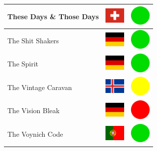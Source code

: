 \documentclass[12pt, a4paper, twoside]{report}
\begin{document}
\begin{center}
\begin{longtable}{|p{5cm}|p{2cm}|p{2cm}|}
 These Days \& Those Days                                   & \includegraphics[width=1cm]{../img/flags/ch} &   \includegraphics[width=1cm]{../likes/y} \\ \hline
 The Shit Shakers                                           & \includegraphics[width=1cm]{../img/flags/de} &   \includegraphics[width=1cm]{../likes/y} \\ \hline
 The Spirit                                                 & \includegraphics[width=1cm]{../img/flags/de} &   \includegraphics[width=1cm]{../likes/y} \\ \hline
 The Vintage Caravan                                        & \includegraphics[width=1cm]{../img/flags/is} &   \includegraphics[width=1cm]{../likes/m} \\ \hline
 The Vision Bleak                                           & \includegraphics[width=1cm]{../img/flags/de} &   \includegraphics[width=1cm]{../likes/n} \\ \hline
 The Voynich Code                                           & \includegraphics[width=1cm]{../img/flags/pt} &   \includegraphics[width=1cm]{../likes/y} \\ \hline

\end{longtable}
\end{center}
\end{document}
